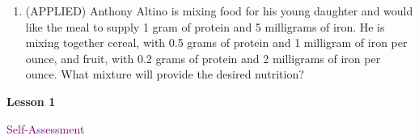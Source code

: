 \documentclass[10pt]{book}
\theoremstyle{definition}
\theoremstyle{remark}
\begin{document}
\begin{large}
\begin{enumerate}
\item (APPLIED) Anthony Altino is mixing food for his young daughter and would like the meal to supply 1 gram of protein and 5 milligrams of iron. He is mixing together cereal, with 0.5 grams of protein and 1 milligram of iron per ounce, and fruit, with 0.2 grams of protein and 2 milligrams of iron per ounce. What mixture will provide the desired nutrition?\vfil
\end{enumerate}
\end{large}
\newpage

\begin{tcolorbox}[
  width=\textwidth,
  colback=gray!10, %
  colframe=white, %
  boxrule=0pt,    %
  left=1cm,       %
  right=1cm,      %
  sharp corners  %
]

\begin{minipage}[t]{0.5\textwidth}
  \Huge \textbf{Lesson 1}
\end{minipage}%
\hfill
\begin{minipage}[t]{0.5\textwidth}
  \Huge\textcolor{purple}{Self-Assessment}
\end{minipage}
\end{tcolorbox}
\end{document}
